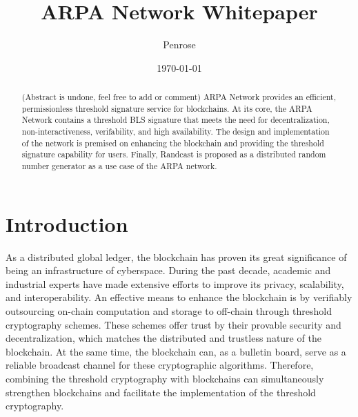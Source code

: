 \documentclass[11pt]{article}
\title{ARPA Network Whitepaper}
\author{Penrose}
\date{\today}
\begin{document}
\maketitle

\begin{abstract}
(Abstract is undone, feel free to add or comment) ARPA Network provides an efficient, permissionless threshold signature service for blockchains. At its core, the ARPA Network contains a threshold BLS signature that meets the need for decentralization, non-interactiveness, verifability, and high availability. The design and implementation of the network is premised on enhancing the blockchain and providing the threshold signature capability for users. Finally, Randcast is proposed as a distributed random number generator as a use case of the ARPA network. 

\end{abstract}

\section{Introduction}
As a distributed global ledger, the blockchain has proven its great significance of being an infrastructure of cyberspace. During the past decade, academic and industrial experts have made extensive efforts to improve its privacy, scalability, and interoperability. An effective means to enhance the blockchain is by verifiably outsourcing on-chain computation and storage to off-chain through threshold cryptography schemes. These schemes offer trust by their provable security and decentralization, which matches the distributed and trustless nature of the blockchain. At the same time, the blockchain can, as a bulletin board, serve as a reliable broadcast channel for these cryptographic algorithms. Therefore, combining the threshold cryptography with blockchains can simultaneously strengthen blockchains and facilitate the implementation of the threshold cryptography.
\end{document}
